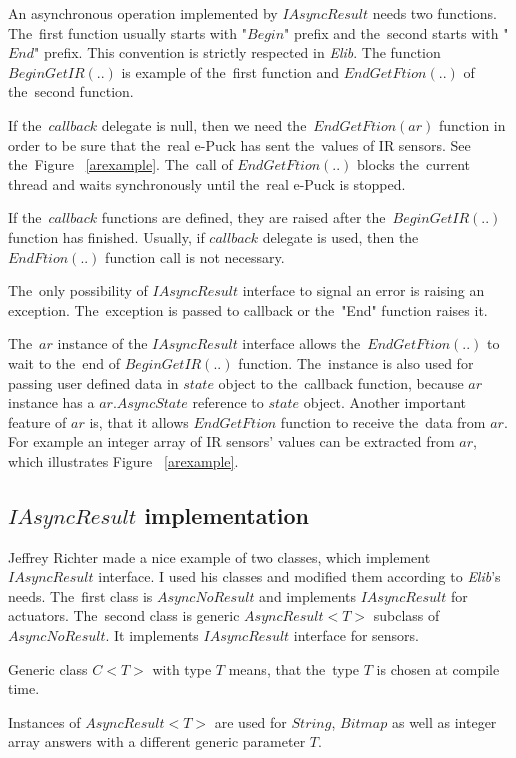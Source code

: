   An asynchronous operation implemented by $IAsyncResult$ needs two functions. 
  The~first function usually starts with 
  "$Begin$" prefix and the~second starts with "$End$" prefix. 
  This convention is strictly respected in {\it Elib}.
  The function $BeginGetIR(..)$ is example of the~first function and $EndGetFtion(..)$ of the~second function.

  If the~$callback$ delegate is null, then we need the~$EndGetFtion(ar)$ function
  in order to be sure that the~real e-Puck has sent the~values of IR sensors. 
  See the~Figure ~\ref{arexample}.
  The~call of $EndGetFtion(..)$ blocks the~current thread and waits synchronously until the~real
  e-Puck is stopped.

  If the~$callback$ functions are defined, they are raised after the~$BeginGetIR(..)$ function has finished.
  Usually, if $callback$ delegate is used, then the~$EndFtion(..)$ function call is not necessary.

  The~only possibility of $IAsyncResult$ interface to signal an error is raising an exception.
  The~exception is passed to callback or the~"End" function raises it.

  The~$ar$ instance of the $IAsyncResult$ interface allows the~$EndGetFtion(..)$ to wait to the~end of $BeginGetIR(..)$ function.
  The~instance is also used for passing user defined data in $state$ object to the~callback function,
  because $ar$ instance has a $ar.AsyncState$ reference to $state$ object.
  Another important feature of $ar$ is, that it allows $EndGetFtion$ function to receive the~data
  from $ar$. For example an integer array of IR sensors' values can be extracted from $ar$, which illustrates Figure ~\ref{arexample}.
  
\subsection{$IAsyncResult$ implementation} \label{sec:iasyncimpl}
  Jeffrey Richter \cite{IAsync} made a nice example of two classes, which implement $IAsyncResult$ interface.
  I used his classes and modified them according to {\it Elib}'s needs.
  The~first class is $AsyncNoResult$ and implements $IAsyncResult$ for actuators.
  The~second class is generic $AsyncResult<T>$ subclass of $AsyncNoResult$. 
  It implements $IAsyncResult$ interface for sensors.
  \begin{definition}
  Generic class $C<T>$ with type $T$ means, that the~type  $T$ is chosen at compile time. 
  \end{definition}
  Instances of $AsyncResult<T>$ are used
  for $String$, $Bitmap$ as well as integer array answers with a different generic parameter $T$.
    

